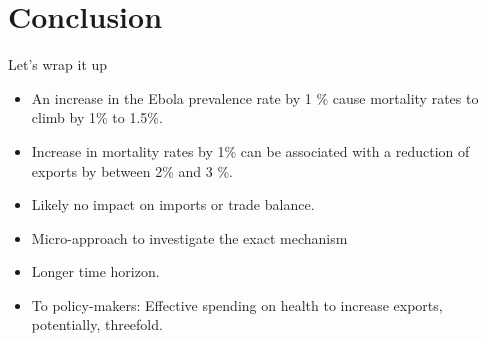 \documentclass[11pt]{beamer}
\begin{document}
\section{Conclusion}
\begin{frame}{Let's wrap it up}
\begin{itemize}
\item An increase in the Ebola prevalence rate by 1 \% cause mortality rates to climb by 1\% to 1.5\%.  \\
\item Increase in mortality rates by 1\% can be associated with a reduction of exports by between 2\% and 3 \%. \\
\item Likely no impact on imports or trade balance. \\
\item Micro-approach to investigate the exact mechanism \\
\item Longer time horizon. \\
\item To policy-makers: Effective spending on health to increase exports, potentially, threefold.
\end{itemize}
\end{frame}
\end{document}
